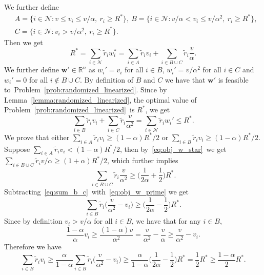 \documentclass[mnsc,non-blindrev]{informs3}
\theoremstyle{definition}
\begin{document}
\begin{appendices}{\Large{}}
We further define
\begin{align*}
&A=\{i\in\mathcal{N}:v\leq v_i\leq v/\alpha,\ r_i\geq R^*\},\ B=\{i\in \mathcal{N}:v/\alpha<v_i\leq v/\alpha^2,\ r_i\geq R^*\},\\
&C=\{i\in\mathcal{N}:v_i>v/\alpha^2,\ r_i\geq R^*\}.
\end{align*}
Then we get
\begin{equation}
R^*=\sum_{i\in\mathcal{N}}\tilde{r}_iw_i^*=\sum_{i\in A}\tilde{r}_iv_i+\sum_{i\in B\cup C}\tilde{r}_i\dfrac{v}{\alpha}.\label{eq:obj_w_star}
\end{equation}
We further define $\bm{w}'\in\mathbb{R}^n$ as $w_i'=v_i$ for all $i\in B$, $w_i'=v/\alpha^2$ for all $i\in C$ and $w_i'=0$ for all $i\notin B\cup C$. By definition of $B$ and $C$ we have that $\bm{w}'$ is feasible to~Problem~\eqref{prob:randomized_linearized}. Since by Lemma~\ref{lemma:randomized_linearized}, the optimal value of Problem~\eqref{prob:randomized_linearized}~is $R^*$, we get
\begin{equation}
\sum_{i\in B}\tilde{r}_iv_i+\sum_{i\in C}\tilde{r}_i\dfrac{v}{\alpha^2}=\sum_{i\in\mathcal{N}}\tilde{r}_iw_i'\leq R^*.\label{eq:obj_w_prime}
\end{equation}
We prove that either $\sum_{i\in A}\tilde{r}_iv_i\geq (1-\alpha)R^*/2$ or $\sum_{i\in B}\tilde{r}_iv_i\geq (1-\alpha)R^*/2$. Suppose $\sum_{i\in A}\tilde{r}_iv_i<(1-\alpha)R^*/2$, then by~\eqref{eq:obj_w_star}~we get
$\sum_{i\in B\cup C}\tilde{r}_iv/\alpha\geq (1+\alpha)R^*/2$, which further implies
\begin{equation}\label{eq:sum_b_c}
\sum_{i\in B\cup C}\tilde{r}_i\dfrac{v}{\alpha^2}\geq \Big(\dfrac{1}{2\alpha}+\dfrac{1}{2}\Big)R^*.
\end{equation}
Subtracting~\eqref{eq:sum_b_c}~with~\eqref{eq:obj_w_prime} we get
\begin{equation*}
\sum_{i\in B}\tilde{r}_i\Big(\dfrac{v}{\alpha^2}-v_i\Big)\geq \Big(\dfrac{1}{2\alpha}-\dfrac{1}{2}\Big)R^*.
\end{equation*}
Since by definition $v_i>v/\alpha$ for all $i\in B$, we have that for any $i\in B$,
\begin{equation*}
\dfrac{1-\alpha}{\alpha}v_i\geq \dfrac{(1-\alpha)v}{\alpha^2}=\dfrac{v}{\alpha^2}-\dfrac{v}{\alpha}\geq \dfrac{v}{\alpha^2}-v_i.
\end{equation*}
Therefore we have
\begin{equation*}
\sum_{i\in B}\tilde{r}_iv_i\geq \dfrac{\alpha}{1-\alpha}\sum_{i\in B}\tilde{r}_i\Big(\dfrac{v}{\alpha^2}-v_i\Big)\geq \dfrac{\alpha}{1-\alpha}\Big(\dfrac{1}{2\alpha}-\dfrac{1}{2}\Big)R^*=\dfrac{1}{2}R^*\geq \dfrac{1-\alpha}{2}R^*.

\end{equation*}
\end{appendices}
\end{document}

